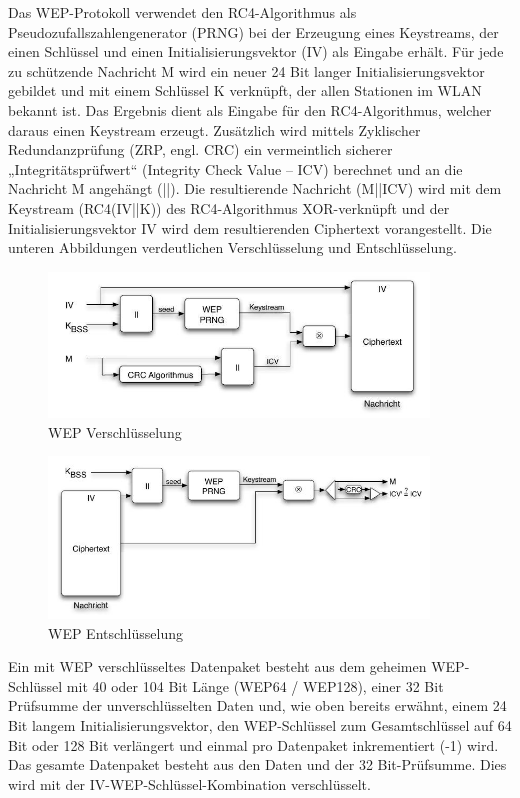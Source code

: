 	Das WEP-Protokoll verwendet den RC4-Algorithmus als Pseudozufallszahlengenerator (PRNG) bei der Erzeugung eines Keystreams, der einen Schlüssel und einen Initialisierungsvektor (IV) als Eingabe erhält. Für jede zu schützende Nachricht M wird ein neuer 24 Bit langer Initialisierungsvektor gebildet und mit einem Schlüssel K verknüpft, der allen Stationen im WLAN bekannt ist. Das Ergebnis dient als Eingabe für den RC4-Algorithmus, welcher daraus einen Keystream erzeugt. Zusätzlich wird mittels Zyklischer Redundanzprüfung (ZRP, engl. CRC) ein vermeintlich sicherer „Integritätsprüfwert“ (Integrity Check Value – ICV) berechnet und an die Nachricht M angehängt (||). Die resultierende Nachricht (M||ICV) wird mit dem Keystream (RC4(IV||K)) des RC4-Algorithmus XOR-verknüpft und der Initialisierungsvektor IV wird dem resultierenden Ciphertext vorangestellt. Die unteren Abbildungen verdeutlichen Verschlüsselung und Entschlüsselung.

	\begin{figure}[H]
		\centering
		\includegraphics[width=0.9\textwidth]{images/WLAN/WEPKodierung.JPG}
		\caption{WEP Verschlüsselung}
		\label{fig:WEP Verschlüsselung}
	\end{figure}

	\begin{figure}[H]
		\centering
		\includegraphics[width=0.9\textwidth]{images/WLAN/WEPDekodierung.JPG}
		\caption{WEP Entschlüsselung}
		\label{fig:WEP Entschlüsselung}
	\end{figure}

	\noindent Ein mit WEP verschlüsseltes Datenpaket besteht aus dem geheimen WEP-Schlüssel mit 40 oder 104 Bit Länge (WEP64 / WEP128), einer 32 Bit Prüfsumme der unverschlüsselten
	Daten und, wie oben bereits erwähnt, einem 24 Bit langem Initialisierungsvektor, den WEP-Schlüssel zum Gesamtschlüssel auf 64 Bit oder 128 Bit verlängert und einmal pro
	Datenpaket inkrementiert (-1) wird. \\
	Das gesamte Datenpaket besteht aus den Daten und der 32 Bit-Prüfsumme. Dies wird
	mit der IV-WEP-Schlüssel-Kombination verschlüsselt.

